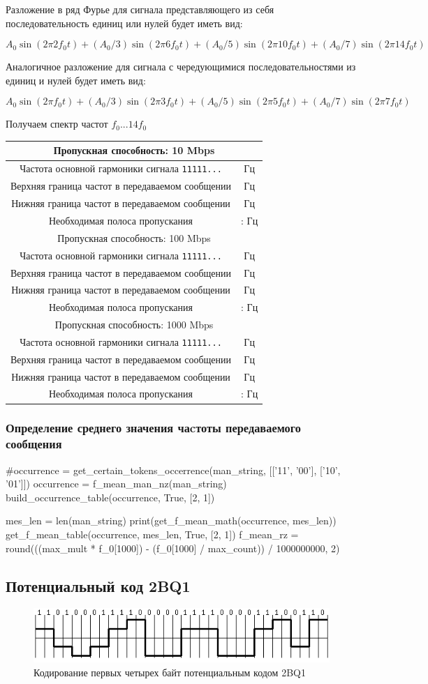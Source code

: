 \documentclass[12pt, a4paper]{article}
\newcommand{\bandwidthEntry}[2]{
  \hline
  \multicolumn{2}{|c|}{Пропускная способность: #1 Mbps} \\
  \hline
  Частота основной гармоники сигнала \texttt{11111...} & \py{int(f_0[#1] * #2)} Гц \\
  Верхняя граница частот в передаваемом сообщении & \py{int(max_mult * f_0[#1])} Гц \\
  Нижняя граница частот в передаваемом сообщении & \py{int(f_0[#1] / max_count)} Гц \\
  Необходимая полоса пропускания & \py{int(f_0[#1] / max_count)} : \py{int(max_mult * f_0[#1])} Гц \\
}
\begin{document}
Разложение в ряд Фурье для сигнала представляющего из себя последовательность
единиц или нулей будет иметь вид:

$$A_0 \sin(2 \pi 2 f_0 t) + (A_0 / 3) \sin(2 \pi 6 f_0 t) +
  (A_0 / 5) \sin(2 \pi 10 f_0 t) + (A_0 / 7) \sin(2 \pi 14 f_0 t)$$

Аналогичное разложение для сигнала с чередующимися последовательностями из
единиц и нулей будет иметь вид:

$$A_0 \sin(2 \pi f_0 t) + (A_0 / 3) \sin(2 \pi 3 f_0 t) +
  (A_0 / 5) \sin(2 \pi 5 f_0 t) + (A_0 / 7) \sin(2 \pi 7 f_0 t)$$

Получаем спектр частот $f_0 ... 14 f_0$

\begin{tabular}{| c | c |}
  \bandwidthEntry{10}{2}
  \bandwidthEntry{100}{2}
  \bandwidthEntry{1000}{2}
  \hline
\end{tabular}

\subsubsection*{Определение среднего значения чаcтоты передаваемого сообщения}


\begin{pycode}
#occurrence = get_certain_tokens_occerrence(man_string, [['11', '00'], ['10', '01']])
occurrence = f_mean_man_nz(man_string)
build_occurrence_table(occurrence, True, [2, 1])

mes_len = len(man_string)
print(get_f_mean_math(occurrence, mes_len))
get_f_mean_table(occurrence, mes_len, True, [2, 1])
f_mean_rz = round(((max_mult * f_0[1000]) - (f_0[1000] / max_count)) / 1000000000, 2)
\end{pycode}

\subsection{Потенциальный код 2BQ1}

\begin{figure}[h]
  \begin{center}
    \includegraphics{pam}
    \caption{Кодирование первых четырех байт потенциальным кодом 2BQ1}
    \label{fig:2bq1}
  \end{center}
\end{figure}
\end{document}
